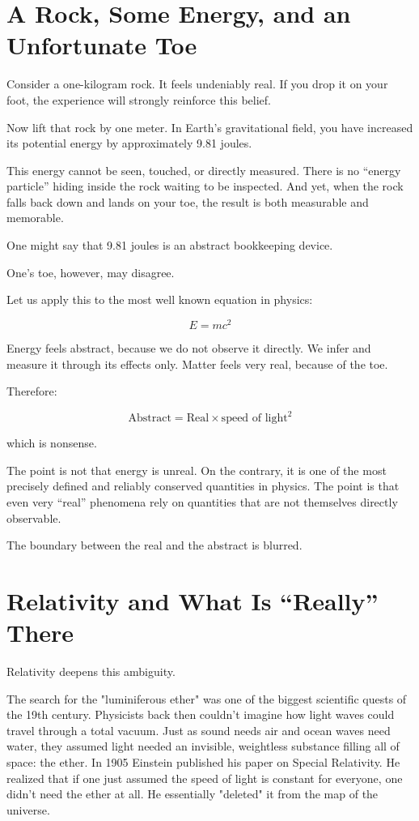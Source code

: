 \section{A Rock, Some Energy, and an Unfortunate Toe}

Consider a one-kilogram rock. It feels undeniably real. If you drop it on your foot, the experience will strongly reinforce this belief.

Now lift that rock by one meter. In Earth's gravitational field, you have increased its potential energy by approximately 9.81 joules.

This energy cannot be seen, touched, or directly measured. There is no ``energy particle'' hiding inside the rock waiting to be inspected.
And yet, when the rock falls back down and lands on your toe, the result is both measurable and memorable.

One might say that 9.81 joules is an abstract bookkeeping device.

One's toe, however, may disagree.

Let us apply this to the most well known equation in physics:

\[
E=mc^2
\]

Energy feels abstract, because we do not observe it directly. We infer and measure it through its effects only.
Matter feels very real, because of the toe. 

Therefore:

\[
\text{Abstract} = \text{Real} \times \text{speed of light}^2
\label{eq:einstein}
\]


which is nonsense.

The point is not that energy is unreal. On the contrary, it is one of the most precisely defined and reliably conserved quantities in physics.
The point is that even very ``real'' phenomena rely on quantities that are not themselves directly observable.

The boundary between the real and the abstract is blurred.



\section{Relativity and What Is ``Really'' There}

Relativity deepens this ambiguity.

The search for the "luminiferous ether" was one of the biggest scientific quests of the 19th century. Physicists back then couldn't imagine how light waves could travel through a total vacuum.
Just as sound needs air and ocean waves need water, they assumed light needed an invisible, weightless substance filling all of space: the ether.
In 1905 Einstein published his paper on Special Relativity. He realized that if one just assumed the speed of light is constant for everyone, one didn't need the ether at all.
He essentially "deleted" it from the map of the universe.

